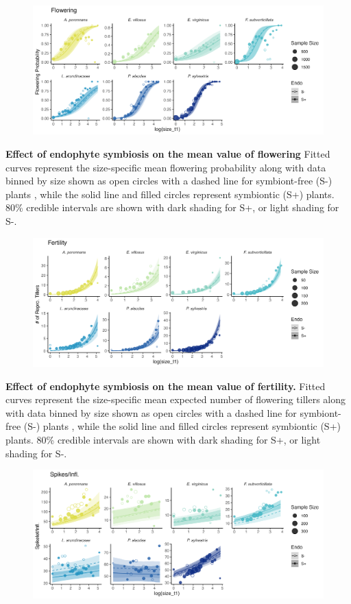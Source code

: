 \documentclass[12pt]{article}
\begin{document}
\begin{figure}[H]
	\centering
	\includegraphics[width=.8\linewidth]{flw_meanplot.png}
\end{figure}
 \textbf{Effect of endophyte symbiosis on the mean value of flowering} Fitted curves represent the size-specific mean flowering probability along with data binned by size shown as open circles with a dashed line for symbiont-free (S-) plants , while the solid line and filled circles represent symbiontic (S+) plants. 80\% credible intervals are shown with dark shading for  S+, or light shading for S-.
\begin{figure}[H]
	\centering
	\includegraphics[width=.8\linewidth]{fert_meanplot.png}
\end{figure}
 \textbf{Effect of endophyte symbiosis on the mean value of fertility.} Fitted curves represent the size-specific mean expected number of flowering tillers along with data binned by size shown as open circles with a dashed line for symbiont-free (S-) plants , while the solid line and filled circles represent symbiontic (S+) plants. 80\% credible intervals are shown with dark shading for  S+, or light shading for S-.
\newpage
\begin{figure}[H]
	\centering
	\includegraphics[width=.8\linewidth]{spike_meanplot.png}
\end{figure}
\end{document}

